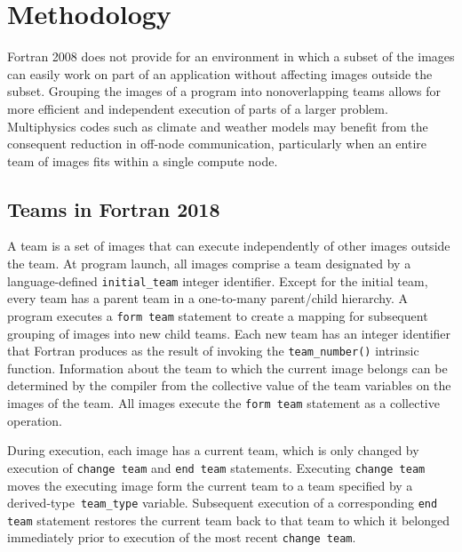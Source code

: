 
\section{Methodology}\label{sec:methodology}
Fortran 2008 does not provide for an environment in which
a subset of the images can easily work on part of an application without affecting
images outside the subset.  Grouping the images of a program into nonoverlapping
teams allows for more efficient and independent execution of parts of a larger
problem.  Multiphysics codes such as climate and weather models may benefit from the
consequent reduction in off-node communication, particularly when an entire team of images
fits within a single compute node.

\subsection{Teams in Fortran 2018}\label{teams-in-fortran-2015}
A team is a set of images that can execute independently of other images outside the team.
At program launch, all images comprise a team designated by a language-defined \texttt{initial\_team} integer identifier.
Except for the initial team, every team has a parent team in a one-to-many parent/child hierarchy.
A program executes a \texttt{form team} statement to create a mapping for subsequent grouping of images into
new child teams.  Each new team has an integer identifier that Fortran produces as the result of invoking the
\texttt{team\_number()} intrinsic function.  Information about the team to which the current image belongs can be
determined by the compiler from the collective value of the team variables on the images of the team.
All images execute the \texttt{form team} statement as a collective operation.

During execution, each image has a current team, which is only changed by execution of \texttt{change team} and
\texttt{end team} statements. Executing \texttt{change team} moves the executing image form the current team to a team
specified by a derived-type~\texttt{team\_type} variable.  Subsequent execution of a corresponding \texttt{end team}
statement restores the current team back to that team to which it belonged immediately prior to execution of the most
recent \texttt{change team}.

